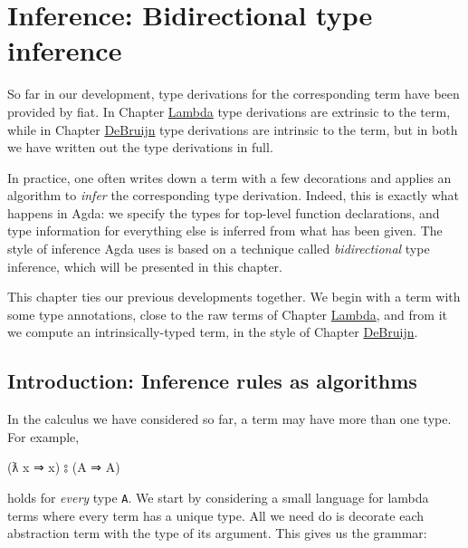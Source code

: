 \hypertarget{Inference}{%
\chapter{Inference: Bidirectional type inference}\label{Inference}}

\begin{fence}
\begin{code}%
\>[0]\AgdaSpace{}%
\AgdaSpace{}%
\<%
\end{code}
\end{fence}

So far in our development, type derivations for the corresponding term
have been provided by fiat. In Chapter
\protect\hyperlink{Lambda}{Lambda} type derivations are extrinsic to the
term, while in Chapter \protect\hyperlink{DeBruijn}{DeBruijn} type
derivations are intrinsic to the term, but in both we have written out
the type derivations in full.

In practice, one often writes down a term with a few decorations and
applies an algorithm to \emph{infer} the corresponding type derivation.
Indeed, this is exactly what happens in Agda: we specify the types for
top-level function declarations, and type information for everything
else is inferred from what has been given. The style of inference Agda
uses is based on a technique called \emph{bidirectional} type inference,
which will be presented in this chapter.

This chapter ties our previous developments together. We begin with a
term with some type annotations, close to the raw terms of Chapter
\protect\hyperlink{Lambda}{Lambda}, and from it we compute an
intrinsically-typed term, in the style of Chapter
\protect\hyperlink{DeBruijn}{DeBruijn}.

\hypertarget{Inference-algorithms}{%
\section{Introduction: Inference rules as
algorithms}\label{Inference-algorithms}}

In the calculus we have considered so far, a term may have more than one
type. For example,

\begin{myDisplay}
(ƛ x ⇒ x) ⦂ (A ⇒ A)
\end{myDisplay}

holds for \emph{every} type \texttt{A}. We start by considering a small
language for lambda terms where every term has a unique type. All we
need do is decorate each abstraction term with the type of its argument.
This gives us the grammar:

